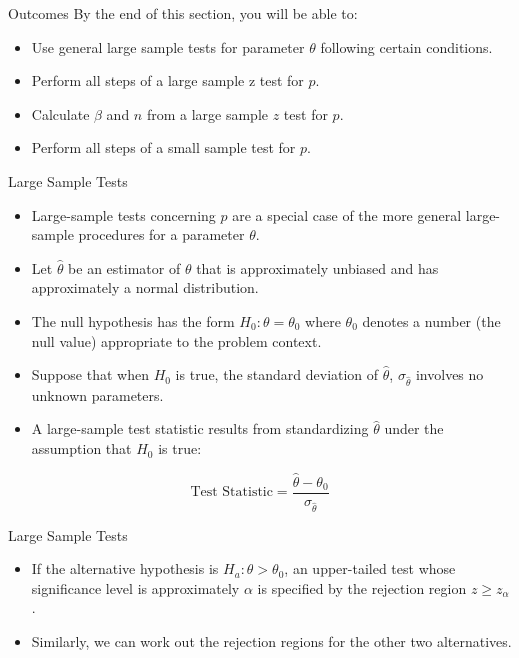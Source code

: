 \documentclass[
  ignorenonframetext,
]{beamer}
\providecommand{\tightlist}{%
  \setlength{\itemsep}{0pt}\setlength{\parskip}{0pt}}\usepackage{longtable,booktabs,array}
\begin{document}
\begin{frame}{Outcomes}
\protect\hypertarget{outcomes-2}{}
By the end of this section, you will be able to:

\begin{itemize}[<+->]
\tightlist
\item
  Use general large sample tests for parameter \(\theta\) following
  certain conditions.
\item
  Perform all steps of a large sample z test for \(p\).
\item
  Calculate \(\beta\) and \(n\) from a large sample \(z\) test for
  \(p\).
\item
  Perform all steps of a small sample test for \(p\).
\end{itemize}
\end{frame}

\begin{frame}{Large Sample Tests}
\protect\hypertarget{large-sample-tests-1}{}
\begin{itemize}[<+->]
\tightlist
\item
  Large-sample tests concerning \(p\) are a special case of the more
  general large-sample procedures for a parameter \(\theta\).
\item
  Let \(\hat{\theta}\) be an estimator of \(\theta\) that is
  approximately unbiased and has approximately a normal distribution.
\item
  The null hypothesis has the form \(H_{0}: \theta = \theta_{0}\) where
  \(\theta_{0}\) denotes a number (the null value) appropriate to the
  problem context.
\item
  Suppose that when \(H_{0}\) is true, the standard deviation of
  \(\hat{\theta}\), \(\sigma_{\hat{\theta}}\) involves no unknown
  parameters.
\item
  A large-sample test statistic results from standardizing
  \(\hat{\theta}\) under the assumption that \(H_{0}\) is true:
\end{itemize}

\[
\text{Test Statistic} = \frac{\hat{\theta} - \theta_{0}}{\sigma_{\hat{\theta}}} 
\]
\end{frame}

\begin{frame}{Large Sample Tests}
\protect\hypertarget{large-sample-tests-2}{}
\begin{itemize}[<+->]
\tightlist
\item
  If the alternative hypothesis is \(H_{a}: \theta > \theta_{0}\), an
  upper-tailed test whose significance level is approximately \(\alpha\)
  is specified by the rejection region \(z \geq z_{\alpha}\).
\item
  Similarly, we can work out the rejection regions for the other two
  alternatives.
\end{itemize}
\end{frame}
\end{document}
